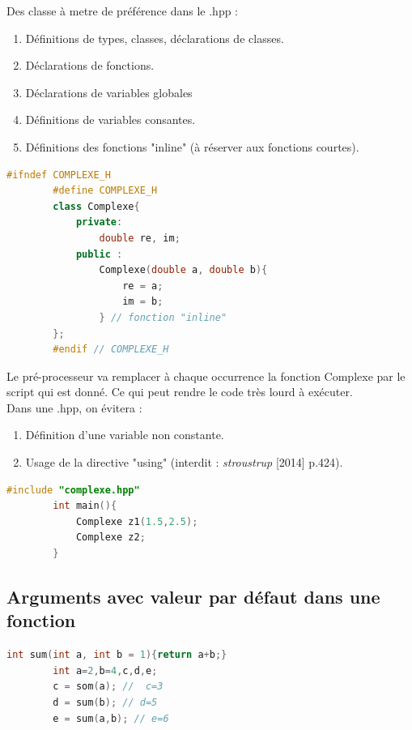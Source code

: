 \documentclass[12pt,a4paper]{article}
\begin{document}
	Des classe à metre de préférence dans le .hpp :
	\begin{enumerate}[label=$\star$]
		\item Définitions de types, classes, déclarations de classes.
		\item Déclarations de fonctions.
		\item Déclarations de variables globales
		\item Définitions de variables consantes.
		\item Définitions des fonctions "inline" (à réserver aux fonctions courtes).
	\end{enumerate}
	\begin{lstlisting}[language=C++,caption=Exemple de fonction "inline" (complexe.hpp)]
		#ifndef COMPLEXE_H
		#define COMPLEXE_H
		class Complexe{
			private:
				double re, im;
			public :
				Complexe(double a, double b){
					re = a;
					im = b;
				} // fonction "inline"
		};
		#endif // COMPLEXE_H
	\end{lstlisting}
	
	Le pré-processeur va remplacer à chaque occurrence la fonction Complexe par le script qui est donné. Ce qui peut rendre le code très lourd à exécuter.\\ 
	
	Dans une .hpp, on évitera :
	\begin{enumerate}[label=$\star$]
		\item Définition d'une variable non constante.
		\item Usage de la directive "using" (interdit : \textit{stroustrup} [2014] p.424).
	\end{enumerate}
	
	\begin{lstlisting}[language=C++,caption=Exemple d'un main.cpp]
		#include "complexe.hpp"
		int main(){
			Complexe z1(1.5,2.5);
			Complexe z2;
		}
	\end{lstlisting}
	
	\vspace{-.5cm}
	
	\subsection{Arguments avec valeur par défaut dans une fonction}
	
	\begin{lstlisting}[language=C++,caption=Exemple 1]
		int sum(int a, int b = 1){return a+b;}
		int a=2,b=4,c,d,e;
		c = som(a); //  c=3
		d = sum(b); // d=5
		e = sum(a,b); // e=6
	\end{lstlisting}
	
\end{document}
